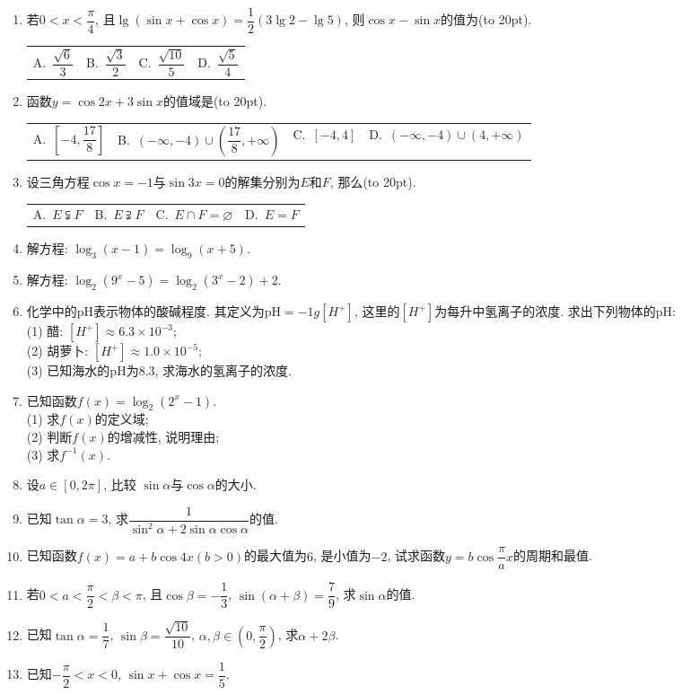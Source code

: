 \documentclass[10pt,a4paper]{article}
\newcommand{\bracket}[1]{(\hbox to #1pt{})}
\newcommand{\twoch}[4]{\par\begin{tabular}{p{.46\textwidth}p{.46\textwidth}}
A.~#1& B.~#2\\
C.~#3& D.~#4
\end{tabular}}
\newcommand{\fourch}[4]{\par\begin{tabular}{p{.23\textwidth}p{.23\textwidth}p{.23\textwidth}p{.23\textwidth}}
A.~#1 &B.~#2& C.~#3& D.~#4
\end{tabular}}
\begin{document}
\begin{enumerate}[1.]
\begin{center}
\end{center}
\twoch{$y=a^x$和$y=\log _a(-x)$}{$y=a^x$和$y=\log _ax^{-1}$}{$y=a^{-x}$和$y=\log _ax^{-1}$}{$y=a^{-x}$和$y=\log _a(-x)$}
\item 若$0<x<\dfrac{\pi}4$, 且$\lg (\sin x+\cos x)=\dfrac 12(3\lg 2-\lg 5)$, 则$\cos x-\sin x$的值为\bracket{20}.
\fourch{$\dfrac{\sqrt 6}3$}{$\dfrac{\sqrt 3}2$}{$\dfrac{\sqrt {10}}5$}{$\dfrac{\sqrt 5}4$}
\item 函数$y=\cos 2x+3\sin x$的值域是\bracket{20}.
\fourch{$[-4,\dfrac{17}8]$}{$(-\infty ,-4)\cup (\dfrac{17}8,+\infty)$}{$[-4,4]$}{$(-\infty ,-4)\cup (4,+\infty)$}
\item 设三角方程$\cos x=-1$与$\sin 3x=0$的解集分别为$E$和$F$, 那么\bracket{20}.
\fourch{$E\subsetneqq F$}{$E\supsetneqq F$}{$E\cap F=\varnothing$}{$E=F$}
\item 解方程: $\log _3(x-1)=\log _9(x+5)$.
\item 解方程: $\log _2(9^x-5)=\log _2(3^x-2)+2$.
\item 化学中的pH表示物体的酸碱程度. 其定义为pH$=-1g[H^+]$, 这里的$[H^+]$为每升中氢离子的浓度. 求出下列物体的pH:\\
(1) 醋: $[H^+]\approx 6.3\times 10^{-3}$;\\
(2) 胡萝卜: $[H^+]\approx 1.0\times 10^{-5}$;\\
(3) 已知海水的pH为$8.3$, 求海水的氢离子的浓度.
\item 已知函数$f(x)=\log _2(2^x-1)$.\\
(1) 求$f(x)$的定义域;\\
(2) 判断$f(x)$的增减性, 说明理由;\\
(3) 求$f^{-1}(x)$.
\item 设$a\in [0,2\pi]$, 比较 $\sin \alpha$与$\cos \alpha$的大小.
\item 已知$\tan \alpha =3$, 求$\dfrac 1{\sin ^2\alpha +2\sin \alpha \cos \alpha}$的值.
\item 已知函数$f(x)=a+b\cos 4x(b>0)$的最大值为$6$, 是小值为$-2$, 试求函数$y=b\cos \dfrac{\pi}ax$的周期和最值.
\item 若$0<a<\dfrac{\pi}2<\beta <\pi$, 且$\cos \beta =-\dfrac 13$, $\sin (\alpha +\beta)=\dfrac 79$, 求$\sin \alpha$的值.
\item 已知$\tan \alpha =\dfrac 17$, $\sin \beta =\dfrac{\sqrt {10}}{10}$, $\alpha, \beta \in (0, \dfrac{\pi}2)$, 求$\alpha +2\beta$.
\item 已知$-\dfrac{\pi}2<x<0$, $\sin x+\cos x=\dfrac 15$.\\

\end{enumerate}
\end{document}
